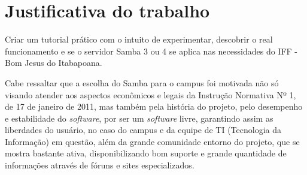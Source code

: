 \section{Justificativa do trabalho}

Criar um tutorial prático com o intuito de experimentar, descobrir o real funcionamento e se o servidor Samba 3 ou 4 se aplica nas necessidades do IFF - Bom Jesus do Itabapoana.




Cabe ressaltar que a escolha do Samba para o campus foi motivada não só visando atender aos aspectos econômicos e legais da Instrução Normativa Nº 1, de 17 de janeiro de 2011, mas também pela história do projeto, pelo desempenho e estabilidade do \textit{software}, por ser um \textit{software} livre, garantindo assim as liberdades do usuário, no caso do campus e da equipe de TI (Tecnologia da Informação) em questão, além da grande comunidade entorno do projeto, que se mostra bastante ativa, disponibilizando bom suporte e grande quantidade de informações através de fóruns e sites especializados.

